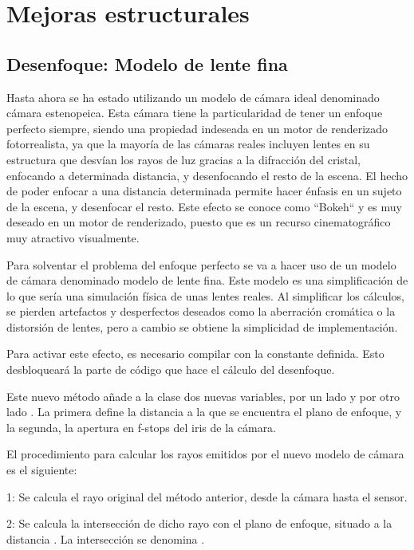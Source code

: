 \chapter{Mejoras estructurales}
				
	\section{Desenfoque: Modelo de lente fina}
	
	Hasta ahora se ha estado utilizando un modelo de cámara ideal denominado cámara estenopeica. Esta cámara tiene la particularidad de tener un enfoque perfecto siempre, siendo una propiedad indeseada en un motor de renderizado fotorrealista, ya que la mayoría de las cámaras reales incluyen lentes en su estructura que desvían los rayos de luz gracias a la difracción del cristal, enfocando a determinada distancia, y desenfocando el resto de la escena. El hecho de poder enfocar a una distancia determinada permite hacer énfasis en un sujeto de la escena, y desenfocar el resto. Este efecto se conoce como ``Bokeh`` y es muy deseado en un motor de renderizado, puesto que es un recurso cinematográfico muy atractivo visualmente.

	Para solventar el problema del enfoque perfecto se va a hacer uso de un modelo de cámara denominado modelo de lente fina. Este modelo es una simplificación de lo que sería una simulación física de unas lentes reales. Al simplificar los cálculos, se pierden artefactos y desperfectos deseados como la aberración cromática o la distorsión de lentes, pero a cambio se obtiene la simplicidad de implementación.

	Para activar este efecto, es necesario compilar con la constante  definida. Esto desbloqueará la parte de código que hace el cálculo del desenfoque. 
	
	Este nuevo método añade a la clase  dos nuevas variables, por un lado  y por otro lado . La primera define la distancia a la que se encuentra el plano de enfoque, y la segunda, la apertura en f-stops del iris de la cámara. 

	El procedimiento para calcular los rayos emitidos por el nuevo modelo de cámara es el siguiente:

	1: Se calcula el rayo original del método anterior, desde la cámara hasta el sensor.
	
	2: Se calcula la intersección de dicho rayo con el plano de enfoque, situado a la distancia . La intersección se denomina .
	
